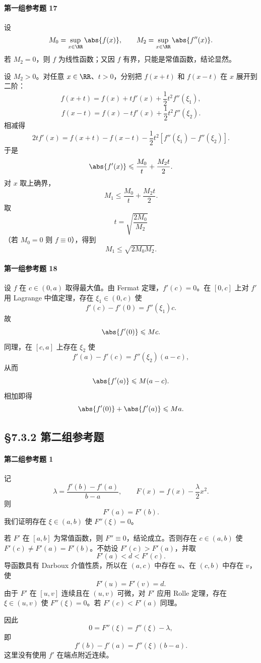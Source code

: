 \paragraph{第一组参考题 17}
\begin{xsolution}
设
\[
  M_0=\sup_{x\in\RR}\abs{f(x)},
  \qquad
  M_2=\sup_{x\in\RR}\abs{f''(x)}.
\]
若 $M_2=0$，则 $f$ 为线性函数；又因 $f$ 有界，只能是常值函数，结论显然。

设 $M_2>0$。对任意 $x\in\RR$、$t>0$，分别把 $f(x+t)$ 和 $f(x-t)$ 在 $x$ 展开到二阶：
\[
  f(x+t)=f(x)+tf'(x)+\frac12t^2f''(\xi_1),
\]
\[
  f(x-t)=f(x)-tf'(x)+\frac12t^2f''(\xi_2).
\]
相减得
\[
  2t f'(x)=f(x+t)-f(x-t)
  -\frac12t^2[f''(\xi_1)-f''(\xi_2)].
\]
于是
\[
  \abs{f'(x)}\leqslant\frac{M_0}{t}+\frac{M_2t}{2}.
\]
对 $x$ 取上确界，
\[
  M_1\leqslant\frac{M_0}{t}+\frac{M_2t}{2}.
\]
取
\[
  t=\sqrt{\frac{2M_0}{M_2}}
\]
（若 $M_0=0$ 则 $f\equiv0$），得到
\[
  M_1\leqslant\sqrt{2M_0M_2}.
\]
\end{xsolution}

\paragraph{第一组参考题 18}
\begin{xsolution}
设 $f$ 在 $c\in(0,a)$ 取得最大值。由 Fermat 定理，$f'(c)=0$。在 $[0,c]$ 上对 $f'$ 用 Lagrange 中值定理，存在 $\xi_1\in(0,c)$ 使
\[
  f'(c)-f'(0)=f''(\xi_1)c.
\]
故
\[
  \abs{f'(0)}\leqslant Mc.
\]
同理，在 $[c,a]$ 上存在 $\xi_2$ 使
\[
  f'(a)-f'(c)=f''(\xi_2)(a-c),
\]
从而
\[
  \abs{f'(a)}\leqslant M(a-c).
\]
相加即得
\[
  \abs{f'(0)}+\abs{f'(a)}\leqslant Ma.
\]
\end{xsolution}

\subsection*{§7.3.2 第二组参考题}

\paragraph{第二组参考题 1}
\begin{xsolution}
记
\[
  \lambda=\frac{f'(b)-f'(a)}{b-a},
  \qquad
  F(x)=f(x)-\frac{\lambda}{2}x^2.
\]
则
\[
  F'(a)=F'(b).
\]
我们证明存在 $\xi\in(a,b)$ 使 $F''(\xi)=0$。

若 $F'$ 在 $[a,b]$ 为常值函数，则 $F''\equiv0$，结论成立。否则存在 $c\in(a,b)$ 使 $F'(c)\neq F'(a)=F'(b)$。不妨设 $F'(c)>F'(a)$，并取
\[
  F'(a)<d<F'(c).
\]
导函数具有 Darboux 介值性质，所以在 $(a,c)$ 中存在 $u$、在 $(c,b)$ 中存在 $v$，使
\[
  F'(u)=F'(v)=d.
\]
由于 $F'$ 在 $[u,v]$ 连续且在 $(u,v)$ 可微，对 $F'$ 应用 Rolle 定理，存在 $\xi\in(u,v)$ 使 $F''(\xi)=0$。若 $F'(c)<F'(a)$ 同理。

因此
\[
  0=F''(\xi)=f''(\xi)-\lambda,
\]
即
\[
  f'(b)-f'(a)=f''(\xi)(b-a).
\]
这里没有使用 $f'$ 在端点附近连续。
\end{xsolution}

